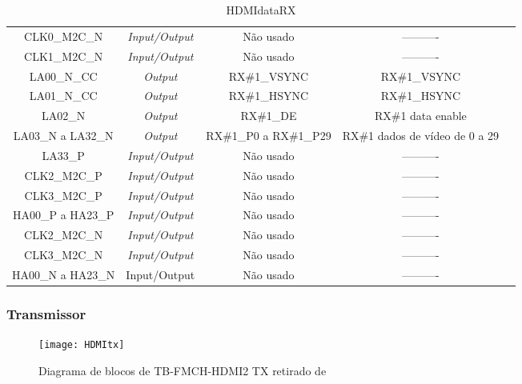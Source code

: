 \begin{enumerate}
\begin{table}[h!]
\begin{tabular}{|c|c|c|c|l}
		CLK0\_M2C\_N         & \textit{Input/Output}          & Não usado              & ----------                     &           \\ \cline{1-4}
		CLK1\_M2C\_N         & \textit{Input/Output}          & Não usado              & ----------                     &           \\ \hline
		LA00\_N\_CC          & \textit{Output}                & RX\#1\_VSYNC           & RX\#1\_VSYNC                   &           \\ \cline{1-4}
		LA01\_N\_CC          & \textit{Output}                & RX\#1\_HSYNC           & RX\#1\_HSYNC                   &           \\ \cline{1-4}
		LA02\_N              & \textit{Output}                & RX\#1\_DE              & RX\#1 data enable              &           \\ \cline{1-4}
		LA03\_N a LA32\_N    & \textit{Output}                & RX\#1\_P0 a RX\#1\_P29 & RX\#1 dados de vídeo de 0 a 29 &           \\ \cline{1-4}
		LA33\_P              & \textit{Input/Output}          & Não usado              & ----------                     &           \\ \cline{1-4}
		CLK2\_M2C\_P         & \textit{Input/Output}          & Não usado              & ----------                     &           \\ \cline{1-4}
		CLK3\_M2C\_P         & \textit{Input/Output}          & Não usado              & ----------                     &           \\ \cline{1-4}
		HA00\_P a HA23\_P    & \textit{Input/Output}          & Não usado              & ----------                     &           \\ \cline{1-4}
		CLK2\_M2C\_N         & \textit{Input/Output}          & Não usado              & ----------                     &           \\ \cline{1-4}
		CLK3\_M2C\_N         & \textit{Input/Output}          & Não usado              & ----------                     &           \\ \cline{1-4}
		HA00\_N a HA23\_N    & Input/Output                   & Não usado              & ----------                     &           \\ \cline{1-4}
	\end{tabular}
	\caption{HDMIdataRX}
	\label{Nomes dos pins da interface FMC de TB-FMCH-HDMI2 RX, adaptada de [9]}
\end{table}


\end{enumerate}


\subsubsection{Transmissor}\label{batik} 
\begin{figure}[h!]
	\begin{center}
		\leavevmode
		\texttt{[image: HDMItx]}
		\caption{Diagrama de blocos de TB-FMCH-HDMI2 TX retirado de \cite{R009}}
		\label{fig:HDMIblocosTX}
	\end{center}
\end{figure}